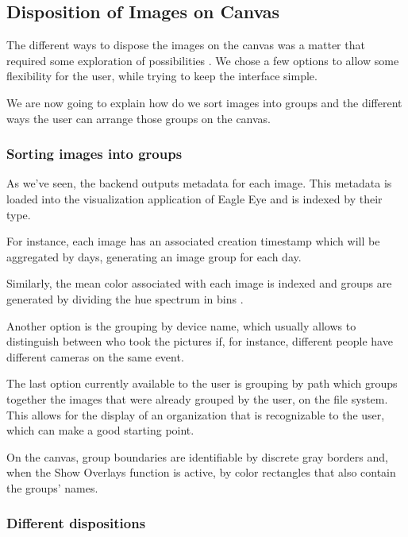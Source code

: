 \subsection{Disposition of Images on Canvas}
\label{sub:dispositions}

The different ways to dispose the images on the canvas was a matter that required some exploration of possibilities . We chose a few options to allow some flexibility for the user, while trying to keep the interface simple.

We are now going to explain how do we sort images into groups and the different ways the user can arrange those groups on the canvas.

\subsubsection{Sorting images into groups}

As we've seen, the backend outputs metadata for each image. This metadata is loaded into the visualization application of Eagle Eye and is indexed by their type.

For instance, each image has an associated creation timestamp which will be aggregated by days, generating an image group for each day.

Similarly, the mean color associated with each image is indexed and groups are generated by dividing the hue spectrum in bins .

Another option is the grouping by device name, which usually allows to distinguish between who took the pictures if, for instance, different people have different cameras on the same event.

The last option currently available to the user is grouping by path which groups together the images that were already grouped by the user, on the file system. This allows for the display of an organization that is recognizable to the user, which can make a good starting point.

On the canvas, group boundaries are identifiable by discrete gray borders and, when the Show Overlays function is active, by color rectangles that also contain the groups' names.


\subsubsection{Different dispositions}

